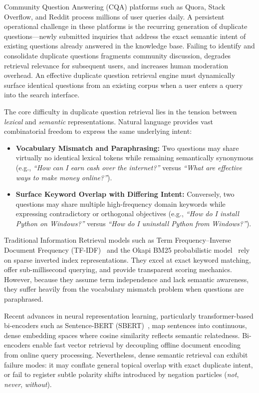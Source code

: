\documentclass[11pt,a4paper]{article}
\begin{document}
Community Question Answering (CQA) platforms such as Quora, Stack Overflow, and Reddit process millions of user queries daily. A persistent operational challenge in these platforms is the recurring generation of duplicate questions---newly submitted inquiries that address the exact semantic intent of existing questions already answered in the knowledge base. Failing to identify and consolidate duplicate questions fragments community discussion, degrades retrieval relevance for subsequent users, and increases human moderation overhead. An effective duplicate question retrieval engine must dynamically surface identical questions from an existing corpus when a user enters a query into the search interface.

The core difficulty in duplicate question retrieval lies in the tension between \textit{lexical} and \textit{semantic} representations. Natural language provides vast combinatorial freedom to express the same underlying intent:
\begin{itemize}[noitemsep,topsep=0pt]
    \item \textbf{Vocabulary Mismatch and Paraphrasing:} Two questions may share virtually no identical lexical tokens while remaining semantically synonymous (e.g., \textit{``How can I earn cash over the internet?''} versus \textit{``What are effective ways to make money online?''}).
    \item \textbf{Surface Keyword Overlap with Differing Intent:} Conversely, two questions may share multiple high-frequency domain keywords while expressing contradictory or orthogonal objectives (e.g., \textit{``How do I install Python on Windows?''} versus \textit{``How do I uninstall Python from Windows?''}).
\end{itemize}

Traditional Information Retrieval models such as Term Frequency--Inverse Document Frequency (TF-IDF)~\cite{salton1988term} and the Okapi BM25 probabilistic model~\cite{robertson2009probabilistic} rely on sparse inverted index representations. They excel at exact keyword matching, offer sub-millisecond querying, and provide transparent scoring mechanics. However, because they assume term independence and lack semantic awareness, they suffer heavily from the vocabulary mismatch problem when questions are paraphrased.

Recent advances in neural representation learning, particularly transformer-based bi-encoders such as Sentence-BERT (SBERT)~\cite{reimers2019sentence}, map sentences into continuous, dense embedding spaces where cosine similarity reflects semantic relatedness. Bi-encoders enable fast vector retrieval by decoupling offline document encoding from online query processing. Nevertheless, dense semantic retrieval can exhibit failure modes: it may conflate general topical overlap with exact duplicate intent, or fail to register subtle polarity shifts introduced by negation particles (\textit{not}, \textit{never}, \textit{without}).
\end{document}
